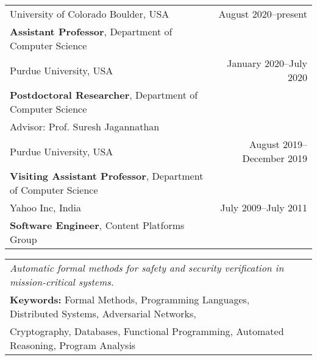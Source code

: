 \documentclass{article}
\begin{document}
\begin{center}
  \begin{tabular}{ p{10cm}  r}
    University of Colorado Boulder, USA  & August 2020--present \\
    {\bf Assistant Professor}, Department of Computer Science &\\[12pt]

    Purdue University, USA & January 2020--July 2020 \\
    {\bf Postdoctoral Researcher}, Department of Computer Science &\\
    Advisor: Prof. Suresh Jagannathan &\\[12pt]

    Purdue University, USA & August 2019--December 2019 \\
    {\bf Visiting Assistant Professor}, Department of Computer Science &\\[12pt]

    Yahoo Inc, India & July 2009--July 2011 \\
    {\bf Software Engineer}, Content Platforms Group &\\[12pt]
    \end{tabular}
\end{center}


\begin{center}
  \begin{tabular}{ l  r }
    \emph{Automatic formal methods for safety and security verification in mission-critical systems.} & \\ [5pt]
{\bf Keywords:} Formal Methods, Programming Languages, Distributed Systems,
Adversarial Networks, &\\
Cryptography, Databases, Functional Programming, Automated Reasoning, Program Analysis&\\ 
\end{tabular}
\end{center}


\vspace{1em}
\end{document}
